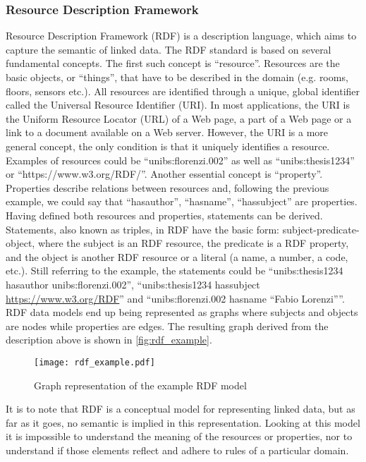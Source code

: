\subsubsection{Resource Description Framework} \label{subsec:rdf}
Resource Description Framework (RDF)\cite{rdf_standard} is a description language, which aims to capture the semantic of linked data. The RDF standard is based on several fundamental concepts. The first such concept is ``resource''. Resources are the basic objects, or ``things'', that have to be described in the domain (e.g. rooms, floors, sensors etc.). All resources are identified through a unique, global identifier called the Universal Resource Identifier (URI). In most applications, the URI is the Uniform Resource Locator (URL) of a Web page, a part of a Web page or a link to a document available on a Web server. However, the URI is a more general concept, the only condition is that it uniquely identifies a resource. Examples of resources could be ``unibs:florenzi.002'' as well as ``unibs:thesis1234'' or ``https://www.w3.org/RDF/''.  Another essential concept is ``property''. Properties describe relations between resources and, following the previous example, we could say that ``has\textunderscore author'', ``has\textunderscore name'', ``has\textunderscore subject'' are properties.  Having defined both resources and properties, statements can be derived. Statements, also known as triples, in RDF have the basic form: subject-predicate-object, where the subject is an RDF resource, the predicate is a RDF property, and the object is another RDF resource or a literal (a name, a number, a code, etc.). Still referring to the example, the statements could be ``unibs:thesis1234 has\textunderscore author unibs:florenzi.002'', ``unibs:thesis1234 has\textunderscore subject \url{https://www.w3.org/RDF}'' and ``unibs:florenzi.002 has\textunderscore name ``Fabio Lorenzi''''.
RDF data models end up being represented as graphs where subjects and objects are nodes while properties are edges. The resulting graph derived from the description above is shown in \autoref{fig:rdf_example}.
\begin{figure}
  \centering
  \texttt{[image: rdf\_example.pdf]}
  \caption{Graph representation of the example RDF model}
  \label{fig:rdf_example}
\end{figure}
It is to note that RDF is a conceptual model for representing linked data, but as far as it goes, no semantic is implied in this representation. Looking at this model it is impossible to understand the meaning of the resources or properties, nor to understand if those elements reflect and adhere to rules of a particular domain.
